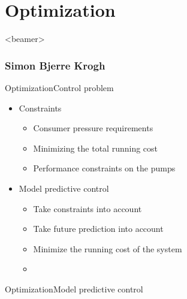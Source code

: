 \section{Optimization}
\begin{frame}<beamer>
\frametitle{Simon Bjerre Krogh}
\tableofcontents[currentsection]
\end{frame}



\begin{frame}{Optimization}{Control problem}
\begin{itemize}
	\item<1-> Constraints  
	\begin{itemize}
	\item<1-> Consumer pressure requirements
	\item<1-> Minimizing the total running cost 
	\item<1-> Performance constraints on the pumps
	\end{itemize}
\end{itemize}

\begin{itemize}
	\item<2-> Model predictive control 
	\begin{itemize}
	\item<2-> Take constraints into account	
	\item<2-> Take future prediction into account 
	\item<2-> Minimize the running cost of the system
	\item<3->[] \vspace{0.5cm}

	\begin{figure}[H]
	\centering
	 
	\end{figure}
	\end{itemize}
\end{itemize}


%  

\end{frame}




\begin{frame}{Optimization}{Model predictive control}

\begin{figure}[H]
\centering
 
\end{figure}


\end{frame}


